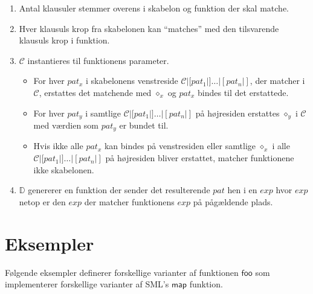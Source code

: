 \documentclass[oneside]{memoir}
\theoremstyle{definition}
\begin{document}
\begin{enumerate}
\item Antal klausuler stemmer overens i skabelon og funktion der skal matche.

\item Hver klausuls krop fra skabelonen kan ``matches'' med den tilsvarende
  klausuls krop i funktion.

\item $\mathcal{C}$ instantieres til funktionens parameter.
  \begin{itemize}
  \item For hver $pat_x$ i skabelonens venstreside
    $\mathcal{C}|[pat_1|]\ldots|[pat_n|]$, der matcher i $\mathcal{C}$,
    erstattes det matchende med $\diamond_x$ og $pat_x$ bindes til det
    erstattede.

  \item For hver $pat_y$ i samtlige $\mathcal{C}|[pat_1|]\ldots|[pat_n|]$ på
    højresiden erstattes $\diamond_y$ i $\mathcal{C}$ med værdien som $pat_y$ er
    bundet til.

  \item Hvis ikke alle $pat_x$ kan bindes på venstresiden eller samtlige
    $\diamond_x$ i alle $\mathcal{C}|[pat_1|]\ldots|[pat_n|]$ på højresiden
    bliver erstattet, matcher funktionene ikke skabelonen.
  \end{itemize}


\item $\mathbb{D}$ genererer en funktion der sender det resulterende $pat$ hen i
  en $exp$ hvor $exp$ netop er den $exp$ der matcher funktionens $exp$ på
  pågældende plads.

\end{enumerate}

\section{Eksempler}

Følgende eksempler definerer forskellige varianter af funktionen $\mathsf{foo}$
som implementerer forskellige varianter af SML's $\mathsf{map}$ funktion.
\end{document}
